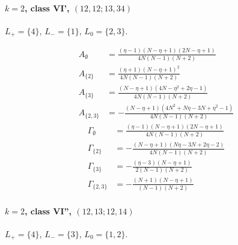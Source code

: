 \documentclass[11pt]{article}
\begin{document}
\paragraph{$k=2$, class VI', $(12,12;13,34)$}

$L_+=\{4\}$, $L_-=\{1\}$, $L_0=\{2,3\}$.

\begin{align*}
  A_{\emptyset} &= \frac{\left(\eta - 1\right) \left(N - \eta + 1\right) \left(2 N - \eta + 1\right)}{4 N \left(N - 1\right) \left(N + 2\right)} \\
  A_{\{2\}} &= \frac{\left(\eta + 1\right) \left(N - \eta + 1\right)^{2}}{4 N \left(N - 1\right) \left(N + 2\right)} \\
  A_{\{3\}} &= \frac{\left(N - \eta + 1\right) \left(4 N - \eta^{2} + 2 \eta - 1\right)}{4 N \left(N - 1\right) \left(N + 2\right)} \\
  A_{\{2,3\}} &= - \frac{\left(N - \eta + 1\right) \left(4 N^{2} + N \eta - 3 N + \eta^{2} - 1\right)}{4 N \left(N - 1\right) \left(N + 2\right)} 
\end{align*}
\begin{align*}
  \Gamma_{\emptyset} &= \frac{\left(\eta - 1\right) \left(N - \eta + 1\right) \left(2 N - \eta + 1\right)}{4 N \left(N - 1\right) \left(N + 2\right)} \\
  \Gamma_{\{2\}} &= - \frac{\left(N - \eta + 1\right) \left(N \eta - 3 N + 2 \eta - 2\right)}{4 N \left(N - 1\right) \left(N + 2\right)} \\
  \Gamma_{\{3\}} &= - \frac{\left(\eta - 3\right) \left(N - \eta + 1\right)}{2 \left(N - 1\right) \left(N + 2\right)} \\
  \Gamma_{\{2,3\}} &= - \frac{\left(N + 1\right) \left(N - \eta + 1\right)}{\left(N - 1\right) \left(N + 2\right)} 
\end{align*}

\paragraph{$k=2$, class VI'', $(12,13;12,14)$}

$L_+=\{4\}$, $L_-=\{3\}$, $L_0=\{1,2\}$.
\end{document}
